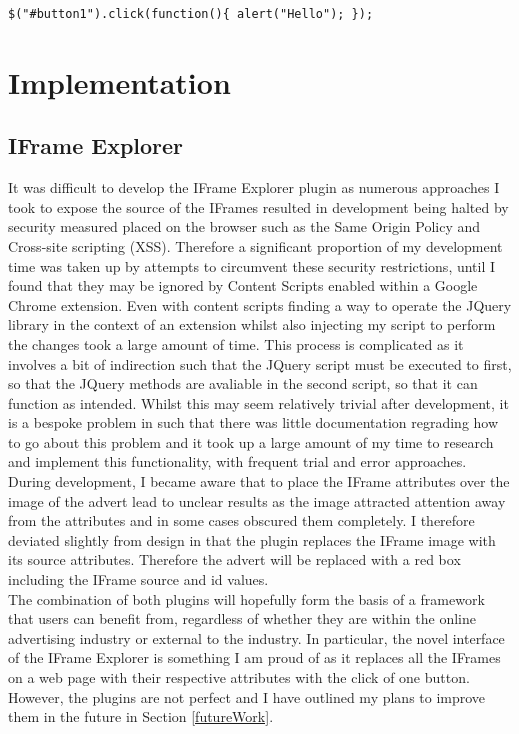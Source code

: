 \documentclass[12pt]{article}
\begin{document}
\begin{lstlisting}[caption=Setting the onClick functionality of button in JQuery, label={jqExample}]
$("#button1").click(function(){ alert("Hello"); });
\end{lstlisting}

\pagebreak

\section{Implementation}

\subsection{IFrame Explorer}
It was difficult to develop the IFrame Explorer plugin as numerous approaches I took to expose the source of the IFrames resulted in development being halted by security measured  placed on the browser such as the Same Origin Policy and Cross-site scripting (XSS). Therefore a significant proportion of my development time was taken up by attempts to circumvent these security restrictions, until I found that they may be ignored by Content Scripts enabled within a Google Chrome extension. Even with content scripts finding a way to operate the JQuery library in the context of an extension whilst also injecting my script to perform the changes took a large amount of time. This process is complicated as it involves a bit of indirection such that the JQuery script must be executed to first, so that the JQuery methods are avaliable in the second script, so that it can function as intended. Whilst this may seem relatively trivial after development, it is a bespoke problem in such that there was little documentation regrading how to go about this problem and it took up a large amount of my time to research and implement this functionality, with frequent trial and error approaches. \\

During development, I became aware that to place the IFrame attributes over the image of the advert lead to unclear results as the image attracted attention away from the attributes and in some cases obscured them completely. I therefore deviated slightly from design in that the plugin replaces the IFrame image with its source attributes. Therefore the advert will be replaced with a red box including the IFrame source and id values. \\

The combination of both plugins will hopefully form the basis of a framework that users can benefit from, regardless of whether they are within the online advertising industry or external to the industry. In particular, the novel interface of the IFrame Explorer is something I am proud of as it replaces all the IFrames on a web page with their respective attributes with the click of one button. However, the plugins are not perfect and I have outlined my plans to improve them in the future in Section \ref{futureWork}.  
\end{document}
